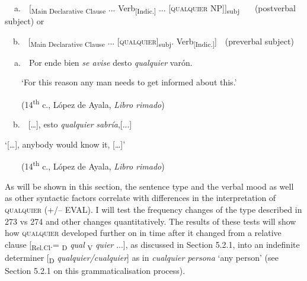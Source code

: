\begin{styleStandard}
\textbf{\ \ }a.\ \ [\textsubscript{Main Declarative Clause} ... Verb\textsubscript{[Indic.] }... [\textsc{qualquier} NP]]\textsubscript{subj} \ \ \ (postverbal subject) or
\end{styleStandard}

\begin{styleStandard}
\ \ b.\ \ [\textsubscript{Main Declarative Clause} ... [\textsc{qualquier}]\textsubscript{subj}. Verb\textsubscript{[Indic.]}]\ \ (preverbal subject)
\end{styleStandard}

\begin{styleStandard}
\textbf{\ \ }a.\ \ Por ende bien \textit{se avise} desto \textit{qualquier} varón. 
\end{styleStandard}

\begin{styleStandard}
\ \ \ \ ‘For this reason any man needs to get informed about this.’
\end{styleStandard}

\begin{styleStandard}
\ \ \ \ (14\textsuperscript{th} c., López de Ayala,\textit{ Libro rimado})
\end{styleStandard}

\begin{styleStandard}
\ \ b.\ \ […], esto \textit{qualquier} \textit{sabría},[...]
\end{styleStandard}

\begin{styleStandard}
‘[…], anybody would know it, […]’
\end{styleStandard}

\begin{styleStandard}
\ \ \ \ (14\textsuperscript{th} c., López de Ayala,\textit{ Libro rimado})
\end{styleStandard}

\begin{styleStandard}
As will be shown in this section, the sentence type and the verbal mood as well as other syntactic factors correlate with differences in the interpretation of \textsc{qualquier} (+/– EVAL). I will test the frequency changes of the type described in 273 vs 274 and other changes quantitatively. The results of these tests will show how \textsc{qualquier} developed further on in time after it changed from a relative clause [\textsubscript{Rel.Cl}.= \textsubscript{D} \textit{qual} \textsubscript{V} \textit{quier} ...], as discussed in Section 5.2.1, into an indefinite determiner [\textsubscript{D} \textit{qualquier/cualquier}] as in \textit{cualquier} \textit{persona} ‘any person’ (see Section 5.2.1 on this grammaticalisation process).
\end{styleStandard}

